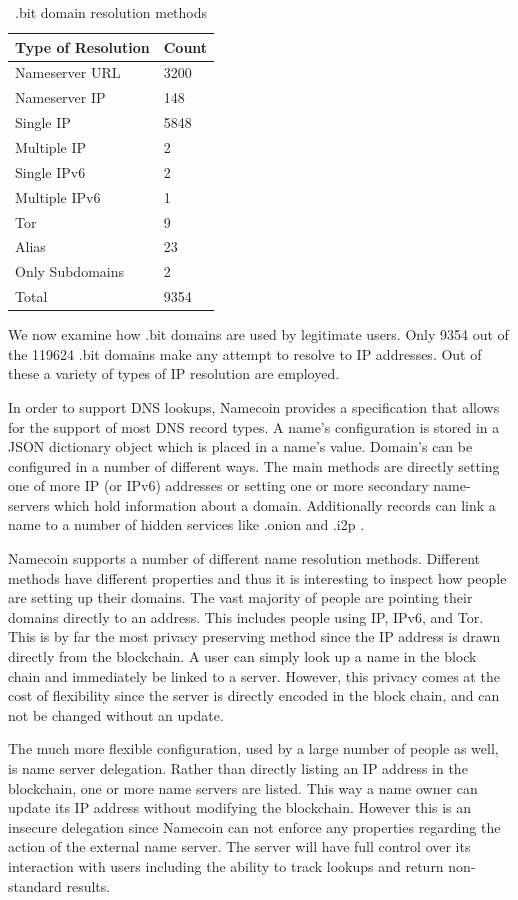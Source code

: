 \begin{table}[t]
\begin{tabular}{ll}
Type of Resolution & Count \\ \hline
Nameserver URL     & 3200  \\
Nameserver IP      & 148   \\
Single IP          & 5848  \\
Multiple IP        & 2     \\
Single IPv6        & 2     \\
Multiple IPv6      & 1     \\
Tor                & 9    \\
Alias              & 23    \\
Only Subdomains    & 2   \\ \hline
Total              & 9354
\end{tabular}
\caption{.bit domain resolution methods}
\end{table}

We now examine how .bit domains are used by legitimate users. Only 9354 out of the 119624 .bit domains make any attempt to resolve to IP addresses. Out of these a variety of types of IP resolution are employed.

In order to support DNS lookups, Namecoin provides a specification that allows for the support of most DNS record types. A name's configuration is stored in a JSON dictionary object which is placed in a name's value. Domain's can be configured in a number of different ways. The main methods are directly setting one of more IP (or IPv6) addresses or setting one or more secondary name-servers which hold information about a domain. Additionally records can link a name to a number of hidden services like .onion \cite{onion} and .i2p \cite{i2p}.

Namecoin supports a number of different name resolution methods. Different methods have different properties and thus it is interesting to inspect how people are setting up their domains. The vast majority of people are pointing their domains directly to an address. This includes people using IP, IPv6, and Tor. This is by far the most privacy preserving method since the IP address is drawn directly from the blockchain. A user can simply look up a name in the block chain and immediately be linked to a server. However, this privacy comes at the cost of flexibility since the server is directly encoded in the block chain, and can not be changed without an update.


The much more flexible configuration, used by a large number of people as well, is name server delegation. Rather than directly listing an IP address in the blockchain, one or more name servers are listed. This way a name owner can update its IP address without modifying the blockchain. However this is an insecure delegation since Namecoin can not enforce any properties regarding the action of the external name server. The server will have full control over its interaction with users including the ability to track lookups and return non-standard results.

